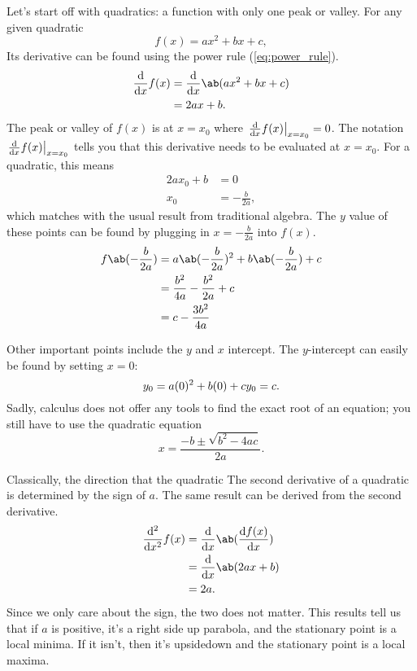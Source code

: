 Let's start off with quadratics: a function with only one peak or valley. For any given quadratic
\begin{equation}
	f(x) = ax^2 + bx + c,
\end{equation}
Its derivative can be found using the power rule (\cref{eq:power_rule}).
\begin{align}
	\odv*{f(x)}{x} &= \odv*{\ab(ax^2 + bx + c)}{x} \\
				   &= 2ax + b.
\end{align}
The peak or valley of $f(x)$ is at $x = x_0$ where $\odv*{f(x)}{x}_{x = x_0} = 0$. The notation $\odv*{f(x)}{x}_{x = x_0}$ tells you that this derivative needs to be evaluated at $x = x_0$. For a quadratic, this means
\begin{align}
	2ax_0 + b &= 0 \\
	x_0 &= -\frac{b}{2a},
\end{align}
which matches with the usual result from traditional algebra. The $y$ value of these points can be found by plugging in $x = -\frac{b}{2a}$ into $f(x)$.
\begin{align}
	f\ab(-\frac{b}{2a}) &= a\ab(-\frac{b}{2a})^2 + b\ab(-\frac{b}{2a}) + c \\
						&= \frac{b^2}{4a} - \frac{b^2}{2a} + c \\
						&= c - \frac{3b^2}{4a} \label{eq:parabola_y_vertex}
\end{align}

Other important points include the $y$ and $x$ intercept. The $y$-intercept can easily be found by setting $x = 0$:
\begin{equation}
	y_0 = a(0)^2 + b(0) + c \\
	y_0 = c.
\end{equation}
Sadly, calculus does not offer any tools to find the exact root of an equation; you still have to use the quadratic equation
\begin{equation}
	x = \frac{- b \pm \sqrt{b^2 - 4ac}}{2a}.
\end{equation}

Classically, the direction that the quadratic The second derivative of a quadratic is determined by the sign of $a$. The same result can be derived from the second derivative.
\begin{align}
	\odv*[ord = 2]{f(x)}{x} &= \odv*{\ab(\odv{f(x)}{x})}{x} \\
							&= \odv*{\ab(2ax + b)}{x} \\
							&= 2a.
\end{align}
Since we only care about the sign, the two does not matter. This results tell us that if $a$ is positive, it's a right side up parabola, and the stationary point is a local minima. If it isn't, then it's upsidedown and the stationary point is a local maxima.

